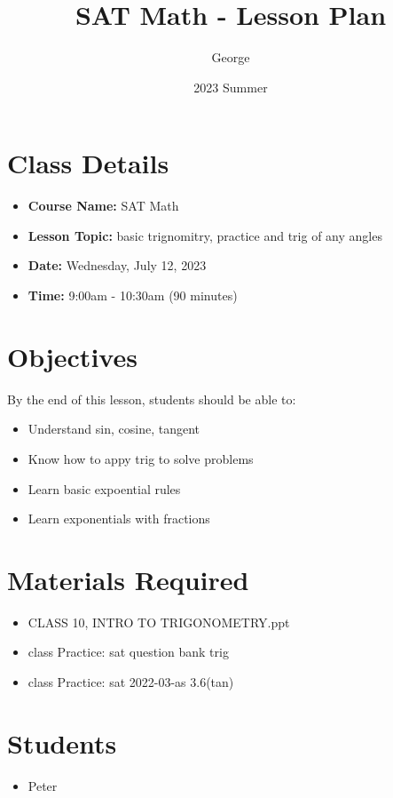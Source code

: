 \documentclass[12pt]{article}
\title{SAT Math - Lesson Plan}
\author{George}
\date{2023 Summer}
\begin{document}
\maketitle

\section{Class Details}
\begin{itemize}
    \item \textbf{Course Name:} SAT Math
    \item \textbf{Lesson Topic:}  basic trignomitry, practice and trig of any angles
    \item \textbf{Date:} Wednesday, July 12, 2023
    \item \textbf{Time:} 9:00am - 10:30am (90 minutes)
\end{itemize}

\section{Objectives}
By the end of this lesson, students should be able to:
\begin{itemize}
    \item Understand sin, cosine, tangent
    \item Know how to appy trig to solve problems
    \item Learn basic expoential rules
    \item Learn exponentials with fractions
\end{itemize}

\section{Materials Required}
\begin{itemize}
   
    \item CLASS 10, INTRO TO TRIGONOMETRY.ppt
    \item class Practice: sat question bank trig
    \item class Practice: sat 2022-03-as 3.6(tan)
  
\end{itemize}


\section{Students}
\begin{itemize}
    \item Peter

\end{itemize}
\end{document}
